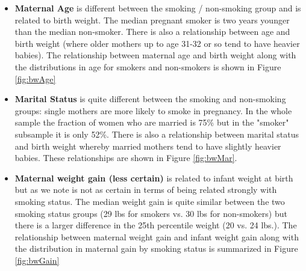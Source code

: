 \documentclass[a4paper, 12pt]{article}
\begin{document}
\begin{itemize}

\item \textbf{Maternal Age} is different between the smoking / non-smoking group and is related to birth weight.  The median pregnant smoker is two years younger than the median non-smoker.  There is also a relationship between age and birth weight (where older mothers up to age 31-32 or so tend to have heavier babies).  The relationship between maternal age and birth weight along with the distributions in age for smokers and non-smokers is shown in Figure \ref{fig:bwAge}

\item \textbf{Marital Status} is quite different between the smoking and non-smoking groups: single mothers are more likely to smoke in pregnancy.  In the whole sample the fraction of women who are married is 75\% but in the "smoker" subsample it is only 52\%.  There is also a relationship between marital status and birth weight whereby married mothers tend to have slightly heavier babies.  These relationships are shown in Figure \ref{fig:bwMar}.

\item \textbf{Maternal weight gain (less certain)} is related to infant weight at birth but as we note is not as certain in terms of being related strongly with smoking status.  The median weight gain is quite similar between the two smoking status groups (29 lbs for smokers vs. 30 lbs for non-smokers) but there is a larger difference in the 25th percentile weight (20 vs. 24 lbs.).  The relationship between maternal weight gain and infant weight gain along with the distribution in maternal gain by smoking status is summarized in Figure \ref{fig:bwGain}


\end{itemize}
\end{document}
